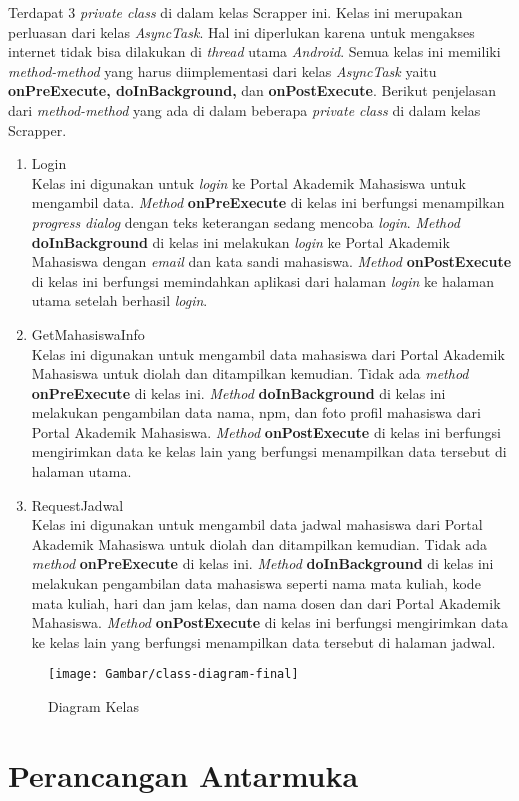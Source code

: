 \begin{enumerate}
		Terdapat 3 \textit{private class} di dalam kelas Scrapper ini. Kelas ini merupakan perluasan dari kelas \textit{AsyncTask}. Hal ini diperlukan karena untuk mengakses internet tidak bisa dilakukan di \textit{thread} utama \textit{Android}. Semua kelas ini memiliki \textit{method-method} yang harus diimplementasi dari kelas \textit{AsyncTask} yaitu \textbf{onPreExecute, doInBackground,} dan \textbf{onPostExecute}. Berikut penjelasan dari \textit{method-method} yang ada di dalam beberapa \textit{private class} di dalam kelas Scrapper.
		
		\begin{enumerate}
		    \item Login\\
		    Kelas ini digunakan untuk \textit{login} ke Portal Akademik Mahasiswa untuk mengambil data. \textit{Method} \textbf{onPreExecute} di kelas ini berfungsi menampilkan \textit{progress dialog} dengan teks keterangan sedang mencoba \textit{login}. \textit{Method} \textbf{doInBackground} di kelas ini melakukan \textit{login} ke Portal Akademik Mahasiswa dengan \textit{email} dan kata sandi mahasiswa. \textit{Method} \textbf{onPostExecute} di kelas ini berfungsi memindahkan aplikasi dari halaman \textit{login} ke halaman utama setelah berhasil \textit{login}. 
		    \item GetMahasiswaInfo\\
		    Kelas ini digunakan untuk mengambil data mahasiswa dari Portal Akademik Mahasiswa untuk diolah dan ditampilkan kemudian. Tidak ada \textit{method} \textbf{onPreExecute} di kelas ini. \textit{Method} \textbf{doInBackground} di kelas ini melakukan pengambilan data nama, npm, dan foto profil mahasiswa dari Portal Akademik Mahasiswa. \textit{Method} \textbf{onPostExecute} di kelas ini berfungsi mengirimkan data ke kelas lain yang berfungsi menampilkan data tersebut di halaman utama. 
		    \item RequestJadwal\\
		    Kelas ini digunakan untuk mengambil data jadwal mahasiswa dari Portal Akademik Mahasiswa untuk diolah dan ditampilkan kemudian. Tidak ada \textit{method} \textbf{onPreExecute} di kelas ini. \textit{Method} \textbf{doInBackground} di kelas ini melakukan pengambilan data mahasiswa seperti nama mata kuliah, kode mata kuliah, hari dan jam kelas, dan nama dosen dan  dari Portal Akademik Mahasiswa. \textit{Method} \textbf{onPostExecute} di kelas ini berfungsi mengirimkan data ke kelas lain yang berfungsi menampilkan data tersebut di halaman jadwal. 
		\end{enumerate}
\end{enumerate}

\begin{figure}[ht]
			\centering
			\texttt{[image: Gambar/class-diagram-final]}
			\caption{Diagram Kelas} 
			\label{fig:4_final_class_diagram}
		\end{figure}

\section{Perancangan Antarmuka}
